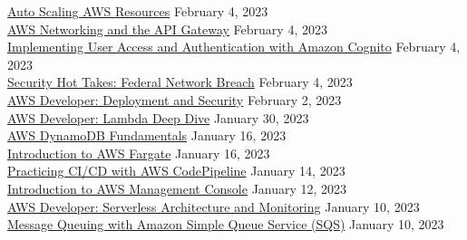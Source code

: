 \documentclass[10pt]{res} %
\begin{document}
\begin{resume}
\href{https://bjdelacruz.dev/files/certificates/pluralsight/Auto_Scaling_AWS_Resources.pdf}{\color{blue}Auto Scaling AWS Resources} \hfill February 4, 2023 \\
\href{https://bjdelacruz.dev/files/certificates/pluralsight/AWS_Networking_and_the_API_Gateway.pdf}{\color{blue}AWS Networking and the API Gateway} \hfill February 4, 2023 \\
\href{https://bjdelacruz.dev/files/certificates/pluralsight/Implementing_User_Access_and_Authentication_with_Amazon_Cognito.pdf}{\color{blue}Implementing User Access and Authentication with Amazon Cognito} \hfill February 4, 2023 \\
\href{https://bjdelacruz.dev/files/certificates/pluralsight/15_Security_Hot_Takes_Federal_Network_Breach.pdf}{\color{blue}Security Hot Takes: Federal Network Breach} \hfill February 4, 2023 \\
\href{https://bjdelacruz.dev/files/certificates/pluralsight/4_AWS_Developer_Deployment_and_Security.pdf}{\color{blue}AWS Developer: Deployment and Security} \hfill February 2, 2023 \\
\href{https://bjdelacruz.dev/files/certificates/pluralsight/AWS_Developer_Lambda_Deep_Dive.pdf}{\color{blue}AWS Developer: Lambda Deep Dive} \hfill January 30, 2023 \\
\href{https://bjdelacruz.dev/files/certificates/pluralsight/AWS_DynamoDB_Fundamentals.pdf}{\color{blue}AWS DynamoDB Fundamentals} \hfill January 16, 2023 \\
\href{https://bjdelacruz.dev/files/certificates/pluralsight/Introduction_to_AWS_Fargate.pdf}{\color{blue}Introduction to AWS Fargate} \hfill January 16, 2023 \\
\href{https://bjdelacruz.dev/files/certificates/pluralsight/Practicing_CI_CD_with_AWS_CodePipeline.pdf}{\color{blue}Practicing CI/CD with AWS CodePipeline} \hfill January 14, 2023 \\
\href{https://bjdelacruz.dev/files/certificates/pluralsight/Introduction_to_AWS_Management_Console.pdf}{\color{blue}Introduction to AWS Management Console} \hfill January 12, 2023 \\
\href{https://bjdelacruz.dev/files/certificates/pluralsight/5_AWS_Developer_Serverless_Architecture_and_Monitoring.pdf}{\color{blue}AWS Developer: Serverless Architecture and Monitoring} \hfill January 10, 2023 \\
\href{https://bjdelacruz.dev/files/certificates/pluralsight/Message_Queuing_with_Amazon_Simple_Queue_Service_SQS.pdf}{\color{blue}Message Queuing with Amazon Simple Queue Service (SQS)} \hfill January 10, 2023 \\

\end{resume}
\end{document}
